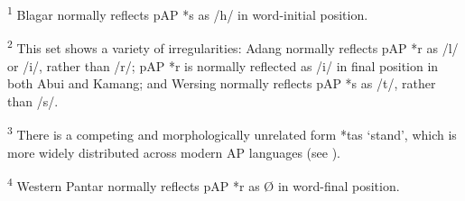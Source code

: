 \textsuperscript{1} Blagar normally reflects pAP *s as /h/ in word-initial position. 

\textsuperscript{2} This set shows a variety of irregularities: Adang normally reflects pAP *r as /l/ or /i/, rather than /r/; pAP *r is normally reflected as /i/ in final position in both Abui and Kamang; and Wersing normally reflects pAP *s as /t/, rather than /s/.

\textsuperscript{3} There is a competing and morphologically unrelated form *tas `stand', which is more widely distributed across modern AP languages (see \citealt{HoltonRobinsonTVhistory}).  

\textsuperscript{4} Western Pantar normally reflects pAP *r as {\O} in word-final position.  

